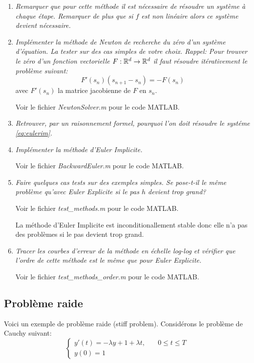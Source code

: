\documentclass[a4paper,10pt]{article}
\begin{document}
\begin{enumerate}
    \item \emph{Remarquer que pour cette méthode il est nécessaire de résoudre un
    système à chaque étape. Remarquer de plus que si $f$ est non linéaire alors ce
    système devient nécessaire.}

    \item \emph{Implémenter la méthode de Newton de recherche du zéro d’un système
    d’équation. La tester sur des cas simples de votre choix. Rappel: Pour trouver
    le zéro d'un fonction vectorielle $F: \mathbb{R}^d \to \mathbb{R}^d$ il faut
    résoudre itérativement le problème suivant:}
\[
    F'(s_n)(s_{n + 1} - s_n) = -F(s_n)
\]
avec $F'(s_n)$ la matrice jacobienne de $F$ en $s_n$.

    Voir le fichier \emph{NewtonSolver.m} pour le code MATLAB.

    \item \emph{Retrouver, par un raisonnement formel, pourquoi l'on doit résoudre le
    systéme \eqref{eq:eulerim}.}

    \item \emph{Implémenter la méthode d’Euler Implicite.}

    Voir le fichier \emph{BackwardEuler.m} pour le code MATLAB.

    \item \emph{Faire quelques cas tests sur des exemples simples. Se pose-t-il le
    même problème qu'avec Euler Explicite si le pas $h$ devient trop grand?}

    Voir le fichier \emph{test\_methods.m} pour le code MATLAB.

    La méthode d'Euler Implicite est inconditionallement stable donc elle n'a pas
    des problèmes si le pas devient trop grand.

    \item \emph{Tracer les courbes d'erreur de la méthode en échelle log-log et
    vérifier que l'ordre de cette méthode est le même que pour Euler Explicite.}

    Voir le fichier \emph{test\_methods\_order.m} pour le code MATLAB.
\end{enumerate}

\subsection{Problème raide}

Voici un exemple de problème raide (stiff problem). Considérons le problème de
Cauchy suivant:
\begin{equation}\label{eq:raide}
\left\{
\begin{array}{ll}
    y'(t) = -\lambda y + 1 + \lambda t, & \quad 0 \leq t \leq T \\
    y(0) = 1 &
\end{array}
\right.
\end{equation}
\end{document}
